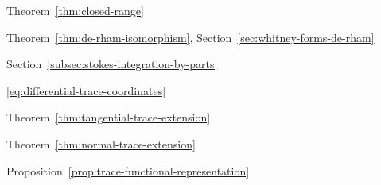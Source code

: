 \par\noindent\hspace*{1em}\label{index:theorem-closed-range}\quad Theorem~\ref{thm:closed-range}

\par\noindent\hspace*{1em}\label{index:theorem-de-rham}\quad Theorem~\ref{thm:de-rham-isomorphism}, Section~\ref{sec:whitney-forms-de-rham}

\par\noindent\hspace*{1em}\label{index:theorem-stokes}\quad Section~\ref{subsec:stokes-integration-by-parts}

\par\noindent\hspace*{0em}\label{index:trace-operator}

\par\noindent\hspace*{1em}\label{index:trace-operator-on-differential-forms}\quad \eqref{eq:differential-trace-coordinates}

\par\noindent\hspace*{1em}\label{index:trace-operator-on-h-operatorname-curl}\quad Theorem~\ref{thm:tangential-trace-extension}

\par\noindent\hspace*{1em}\label{index:trace-operator-on-h-operatorname-div}\quad Theorem~\ref{thm:normal-trace-extension}

\par\noindent\hspace*{1em}\label{index:trace-operator-on-h-1}\quad Proposition~\ref{prop:trace-functional-representation}

